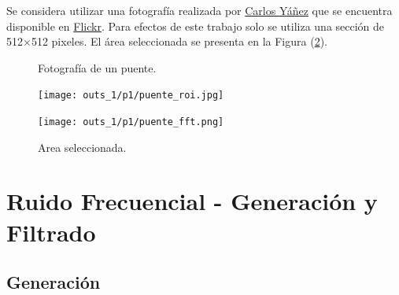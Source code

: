 \documentclass[
  letterpaper,
  twocolumn,
  9pt,
  journal,
  final]{IEEEtran}
\begin{document}
Se considera utilizar una fotografía realizada por \href{https://www.flickr.com/photos/carlosyanez/}{Carlos Yáñez} que se encuentra disponible en \href{https://www.flickr.com/photos/carlosyanez/29061122837/}{Flickr}. Para efectos de este trabajo solo se utiliza una sección de 512$\times$512 pixeles. El área seleccionada se presenta en la Figura (\ref{fig:roi_fft}).

\begin{figure}[!tbh]
  \begin{center}
  \end{center}
  \caption{Fotografía de un puente.} \label{fig:original}
\end{figure}

\begin{figure}[!tbh]
  \centering
  \begin{minipage}[b]{0.49\columnwidth}
    \texttt{[image: outs\_1/p1/puente\_roi.jpg]}
	\end{minipage}
  \begin{minipage}[b]{0.49\columnwidth}
    \texttt{[image: outs\_1/p1/puente\_fft.png]}
  \end{minipage}
  \caption{Area seleccionada.} \label{fig:roi_fft}
\end{figure}


\section{Ruido Frecuencial - Generación y Filtrado}

\subsection{Generación}
\end{document}
